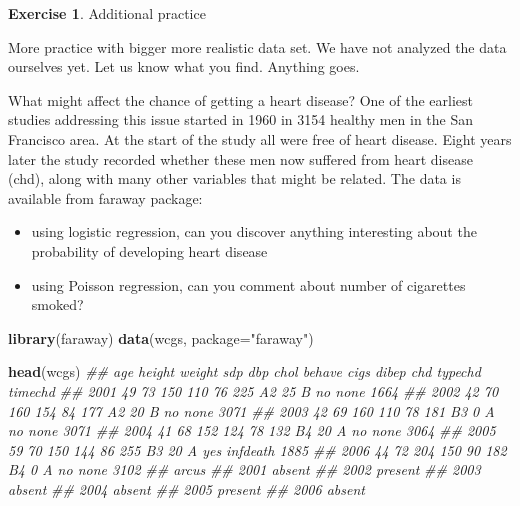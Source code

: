 \documentclass[
]{book}
\newenvironment{Shaded}{\begin{snugshade}}{\end{snugshade}}
\newcommand{\CommentTok}[1]{\textcolor[rgb]{0.56,0.35,0.01}{\textit{#1}}}
\newcommand{\DataTypeTok}[1]{\textcolor[rgb]{0.13,0.29,0.53}{#1}}
\newcommand{\KeywordTok}[1]{\textcolor[rgb]{0.13,0.29,0.53}{\textbf{#1}}}
\newcommand{\NormalTok}[1]{#1}
\newcommand{\StringTok}[1]{\textcolor[rgb]{0.31,0.60,0.02}{#1}}
\providecommand{\tightlist}{%
  \setlength{\itemsep}{0pt}\setlength{\parskip}{0pt}}
\theoremstyle{definition}
\theoremstyle{definition}
\theoremstyle{definition}
\newtheorem{exercise}{Exercise}[chapter]
\theoremstyle{remark}
\begin{document}
\begin{exercise}
\protect\hypertarget{exr:glm-wcgs}{}{\label{exr:glm-wcgs} }
Additional practice

More practice with bigger more realistic data set. We have not analyzed the data ourselves yet. Let us know what you find. Anything goes.

What might affect the chance of getting a heart disease? One of the earliest studies addressing this issue started in 1960 in 3154 healthy men in the San Francisco area. At the start of the study all were free of heart disease. Eight years later the study recorded whether these men now suffered from heart disease (chd), along with many other variables that might be related. The data is available from faraway package:

\begin{itemize}
\tightlist
\item
  using logistic regression, can you discover anything interesting about the probability of developing heart disease
\item
  using Poisson regression, can you comment about number of cigarettes smoked?
\end{itemize}
\end{exercise}

\begin{Shaded}
\begin{Highlighting}[]

\KeywordTok{library}\NormalTok{(faraway)}
\KeywordTok{data}\NormalTok{(wcgs, }\DataTypeTok{package=}\StringTok{"faraway"}\NormalTok{)}

\KeywordTok{head}\NormalTok{(wcgs)}
\CommentTok{\#\#      age height weight sdp dbp chol behave cigs dibep chd  typechd timechd}
\CommentTok{\#\# 2001  49     73    150 110  76  225     A2   25     B  no     none    1664}
\CommentTok{\#\# 2002  42     70    160 154  84  177     A2   20     B  no     none    3071}
\CommentTok{\#\# 2003  42     69    160 110  78  181     B3    0     A  no     none    3071}
\CommentTok{\#\# 2004  41     68    152 124  78  132     B4   20     A  no     none    3064}
\CommentTok{\#\# 2005  59     70    150 144  86  255     B3   20     A yes infdeath    1885}
\CommentTok{\#\# 2006  44     72    204 150  90  182     B4    0     A  no     none    3102}
\CommentTok{\#\#        arcus}
\CommentTok{\#\# 2001  absent}
\CommentTok{\#\# 2002 present}
\CommentTok{\#\# 2003  absent}
\CommentTok{\#\# 2004  absent}
\CommentTok{\#\# 2005 present}
\CommentTok{\#\# 2006  absent}
\end{Highlighting}
\end{Shaded}
\end{document}
